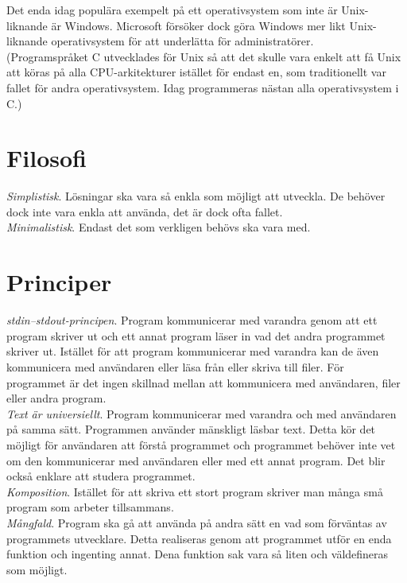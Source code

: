 \documentclass[12pt,a4paper]{article}
\begin{document}
Det enda idag populära exempelt på ett operativsystem som inte
är Unix-liknande är Windows. Microsoft försöker dock göra
Windows mer likt Unix-liknande operativsystem för att underlätta
för administratörer.
\\

\noindent
(Programspråket C utvecklades för Unix så att det skulle
vara enkelt att få Unix att köras på alla CPU-arkitekturer
istället för endast en, som traditionellt var fallet för
andra operativsystem. Idag programmeras nästan alla
operativsystem i C.)


\section*{Filosofi}

\emph{Simplistisk}. Lösningar ska vara så enkla som möjligt att utveckla.
De behöver dock inte vara enkla att använda, det är dock ofta fallet.
\\

\noindent
\emph{Minimalistisk}. Endast det som verkligen behövs ska vara med.


\section*{Principer}

\emph{stdin--stdout-principen}. Program kommunicerar med varandra
genom att ett program skriver ut och ett annat program läser in
vad det andra programmet skriver ut. Istället för att program
kommunicerar med varandra kan de även kommunicera med användaren
eller läsa från eller skriva till filer. För programmet är det
ingen skillnad mellan att kommunicera med användaren, filer eller
andra program.
\\

\noindent
\emph{Text är universiellt}. Program kommunicerar med varandra
och med användaren på samma sätt. Programmen använder mänskligt
läsbar text. Detta kör det möjligt för användaren att förstå
programmet och programmet behöver inte vet om den kommunicerar
med användaren eller med ett annat program. Det blir också enklare
att studera programmet.
\\

\noindent
\emph{Komposition}. Istället för att skriva ett stort program
skriver man många små program som arbeter tillsammans.
\\

\noindent
\emph{Mångfald}. Program ska gå att använda på andra sätt en
vad som förväntas av programmets utvecklare. Detta realiseras
genom att programmet utför en enda funktion och ingenting annat.
Dena funktion sak vara så liten och väldefineras som möjligt.
\end{document}
